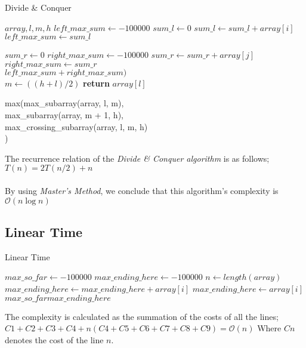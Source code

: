 \documentclass[twocolumns]{IEEEtran}
\begin{document}
\begin{algorithm}
	\caption{Divide \& Conquer}
	\begin{algorithmic}[1]
		
	 {$array, l, m, h$}
	\State$left\_max\_sum \leftarrow -100000$
	\State$sum\_l \leftarrow 0$
		\State$sum\_l \leftarrow sum\_l + array[i]$
			\State $left\_max\_sum \leftarrow sum\_l$
		\EndIf
	\EndFor
	
	\State $sum\_r \leftarrow 0$
	\State $right\_max\_sum \leftarrow -100000$
		\State$sum\_r \leftarrow sum\_r + array[j]$
			\State $right\_max\_sum \leftarrow sum\_r$
		\EndIf
	\EndFor\\
	\Return$left\_max\_sum + right\_max\_sum )$
	\EndFunction
	\\
		\State $m \leftarrow ((h + l) / 2)$
			\State \textbf{return} $array[l]$
		\EndIf
		
		\Return max(max\_subarray(array, l, m),\\
		max\_subarray(array, m + 1, h),\\
		max\_crossing\_subarray(array, l, m, h)\\
		)
	\EndFunction
	\end{algorithmic}
\end{algorithm}
\newpage
The recurrence relation of the \textit{Divide \& Conquer algorithm} is as follows; 
$T(n) = 2T(n/2) + n $ \\ \\
By using \textit{Master's Method}, we conclude that this algorithm's complexity is $\mathcal{O}(n\log n)$
\subsection{Linear Time}

\begin{algorithm}
	\caption{Linear Time}
	\begin{algorithmic}[1]
	\State$max\_so\_far \leftarrow -100000$ \Comment{$1$}
	\State$max\_ending\_here \leftarrow -100000$ \Comment{$1$}
	\State$n \leftarrow length(array)$ \Comment{$1$}
		  \Comment{$n + 1$}
			\State$max\_ending\_here \leftarrow max\_ending\_here + array[i]$ \Comment{$n$}
			\Comment{$n$} 
					\State$max\_ending\_here \leftarrow array[i]$\Comment{$n$}
			\EndIf
			 \Comment{$n$}
				\State$max\_so\_far max\_ending\_here$ \Comment{$n$}
			\EndIf

		\EndFor
	\end{algorithmic}
\end{algorithm}
\newpage
The complexity is calculated as the summation of the costs of all the lines;
$ C1 + C2 +C3 + C4 + n(C4 + C5 + C6 + C7 + C8 + C9) = \mathcal{O}(n) $
Where $Cn$ denotes the cost of the line $n$.
\end{document}
